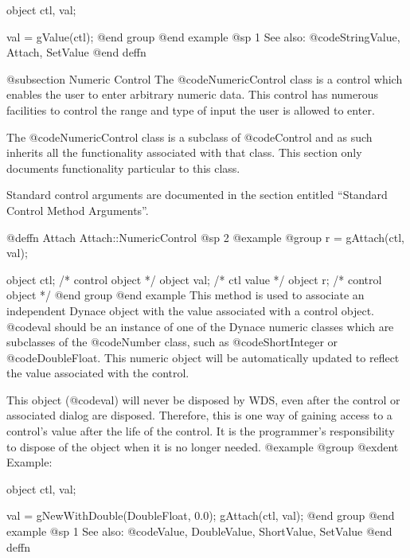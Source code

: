 object  ctl, val;

val = gValue(ctl);
@end group
@end example
@sp 1
See also:  @code{StringValue, Attach, SetValue}
@end deffn








@subsection Numeric Control
The @code{NumericControl} class is a control which enables the user to
enter arbitrary numeric data.  This control has numerous facilities to
control the range and type of input the user is allowed to enter.

The @code{NumericControl} class is a subclass of @code{Control} and as such
inherits all the functionality associated with that class.  This section
only documents functionality particular to this class.

Standard control arguments are documented in the section entitled
``Standard Control Method Arguments''.












@deffn {Attach} Attach::NumericControl
@sp 2
@example
@group
r = gAttach(ctl, val);

object  ctl;   /*  control object  */
object  val;   /*  ctl value       */
object  r;     /*  control object  */
@end group
@end example
This method is used to associate an independent Dynace object with the
value associated with a control object.  @code{val} should be an
instance of one of the Dynace numeric classes which are subclasses of
the @code{Number} class, such as @code{ShortInteger} or
@code{DoubleFloat}.  This numeric object will be automatically updated
to reflect the value associated with the control.

This object (@code{val}) will never be disposed by WDS, even after
the control or associated dialog are disposed.  Therefore, this
is one way of gaining access to a control's value after the life
of the control.  It is the programmer's responsibility to dispose of
the object when it is no longer needed.
@example
@group
@exdent Example:

object  ctl, val;

val = gNewWithDouble(DoubleFloat, 0.0);
gAttach(ctl, val);
@end group
@end example
@sp 1
See also:  @code{Value, DoubleValue, ShortValue, SetValue}
@end deffn












